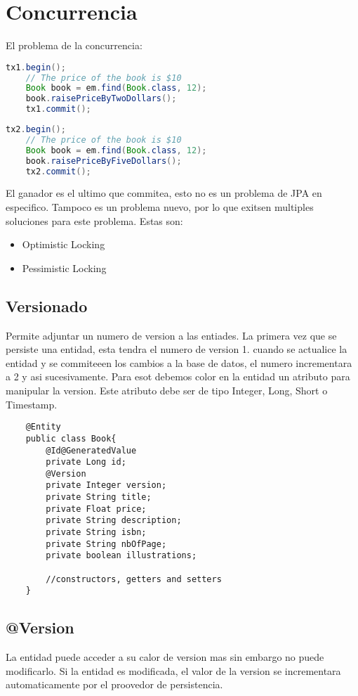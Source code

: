 \documentclass{article}
\begin{document}
\section*{Concurrencia}
El problema de la concurrencia:

\begin{lstlisting}[language=Java]
    tx1.begin();
    // The price of the book is $10
    Book book = em.find(Book.class, 12);
    book.raisePriceByTwoDollars();
    tx1.commit();
\end{lstlisting}
\begin{lstlisting}[language=Java]
    tx2.begin();
    // The price of the book is $10
    Book book = em.find(Book.class, 12);
    book.raisePriceByFiveDollars();
    tx2.commit();
\end{lstlisting}

El ganador es el ultimo que commitea, esto no es un problema de JPA en especifico. Tampoco es un problema nuevo, por lo que exitsen multiples soluciones para este problema. Estas son:
\begin{itemize}
	\item Optimistic Locking
	\item Pessimistic Locking
\end{itemize}

\subsection*{Versionado}
Permite adjuntar un numero de version a las entiades. La primera vez que se persiste una entidad, esta tendra el numero de version 1. cuando se actualice la entidad y se commiteeen los cambios
a la base de datos, el numero incrementara a 2 y asi sucesivamente. Para esot debemos color en la entidad un atributo para manipular la version. Este atributo debe ser de tipo Integer, Long, Short
o Timestamp.

\begin{lstlisting}
    @Entity
    public class Book{
        @Id@GeneratedValue
        private Long id;
        @Version
        private Integer version;
        private String title;
        private Float price;
        private String description;
        private String isbn;
        private String nbOfPage;
        private boolean illustrations;

        //constructors, getters and setters
    }
    \end{lstlisting}
\subsection*{@Version}
  La entidad puede acceder a su calor de version mas sin embargo no puede modificarlo. Si la entidad es modificada, el valor de la version se incrementara automaticamente por el proovedor de persistencia.
\end{document}
